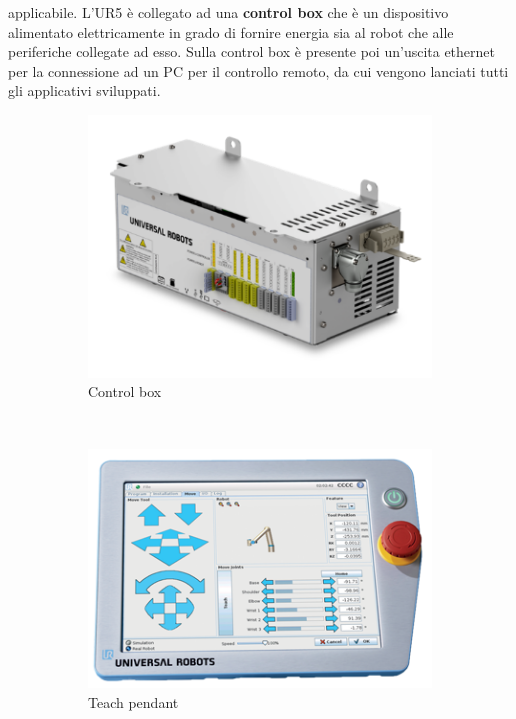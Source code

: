applicabile.
L'UR5 \`{e} collegato ad una \textbf{control box} che \`{e} un dispositivo alimentato elettricamente 
in grado di fornire energia sia al robot che alle periferiche collegate ad esso. Sulla control box \`{e} presente poi un'uscita 
ethernet per la connessione ad un PC per il controllo remoto, da cui vengono lanciati tutti 
gli applicativi sviluppati.
\begin{figure}[H]
    \centering
    \begin{subfigure}[b]{0.4\textwidth}
        \includegraphics[width=\textwidth]{images/control-box.png}
        \caption{Control box}
        \label{fig:control-box}
    \end{subfigure}
    ~ %
    \begin{subfigure}[b]{0.4\textwidth}
        \includegraphics[width=\textwidth]{images/teach_pendant.png}
        \caption{Teach pendant}
        \label{fig:teach_pendant}
    \end{subfigure}
    \caption{}
    \label{fig:box-pendant}
\end{figure}

